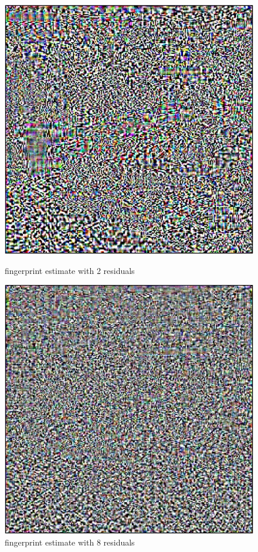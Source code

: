 \documentclass[fleqn,compress,utf8,aspectratio=169,t,handout]{beamer}
\begin{document}
\begin{frame}
	\begin{figure}[h]
    \centering
    \begin{minipage}{0.45\textwidth}
      \includegraphics[width = 0.8 \textwidth]{figs/ProGAN_Kitchen_F002.jpg}
      \caption{fingerprint estimate with 2 residuals}
    \end{minipage}
    \hfill
    \pause
		\begin{minipage}{0.45\textwidth}
      \includegraphics[width = 0.8 \textwidth]{figs/ProGAN_Kitchen_F008.jpg}
      \caption{fingerprint estimate with 8 residuals}
    \end{minipage}
	\end{figure}
\end{frame}
\end{document}
